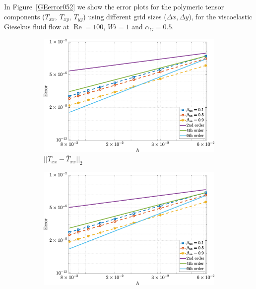 \documentclass[preprint, 12pt]{elsarticle}
\begin{document}
In Figure~\ref{GEerror052} we show the error plots for the polymeric tensor components ($T_{xx},~T_{xy},~T_{yy}$) using different grid sizes ($\Delta x, \Delta y$), for the viscoelastic Giesekus fluid flow at $\operatorname{Re}=100$, $Wi=1$ and $\alpha_G=0.5$.
\begin{figure}[H]
    \centering  
    \begin{subfigure}[b]{.46\textwidth}
        \includegraphics[width=\textwidth]{NormErr_2nd_Re_100_Wi_1_epsilon_0_xi_0_alphaG_0.5_Dt_1e-06_at_0.05_tipsim_1_MMS_12_Txx.eps}
        \caption{$||T_{xx} - \overline{T}_{xx}||_{2}$}
        \label{error_txx_2nd_Case1_giesekus_alphaG_0.5}
    \end{subfigure}
    \vspace{0.2cm}
    \qquad
    \begin{subfigure}[b]{.46\textwidth}
        \includegraphics[width=\textwidth]{NormErr_2nd_Re_100_Wi_1_epsilon_0_xi_0_alphaG_0.5_Dt_1e-06_at_0.05_tipsim_1_MMS_12_Txy.eps}

\end{subfigure}
\end{figure}
\end{document}
